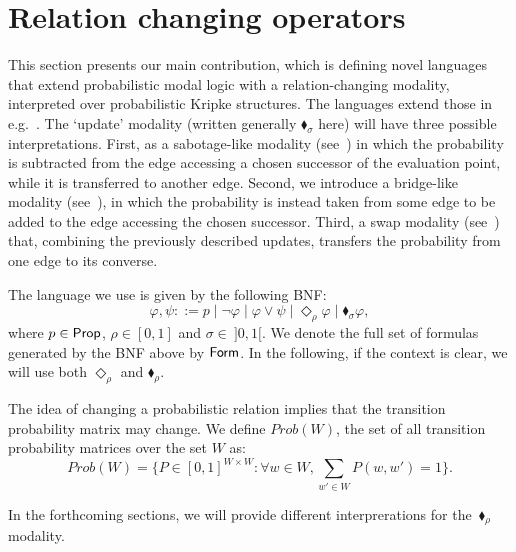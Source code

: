\section{Relation changing operators}\label{sec:prcml}

This section presents our main contribution, which is defining novel languages that extend probabilistic modal logic with a relation-changing modality, interpreted over probabilistic Kripke structures. The languages extend those in e.g.~\cite{ShiraziA07,ALDINI2024109167}. 
The `update' modality (written generally $\blacklozenge_{\sigma}$ here) will have three possible interpretations. First, as a sabotage-like modality (see~\cite{Fervari14,ArecesFH15,Aucher&vanBenthem&Grossi18})
in which the probability is subtracted from the edge accessing a chosen successor of the evaluation point, while it is transferred to another edge. Second, we introduce a bridge-like modality (see~\cite{Fervari14,ArecesFH15}), in which the probability is instead taken from some edge to be added to the edge accessing the chosen successor.  Third, a swap modality (see~\cite{ArecesFH14,Fervari14,ArecesFH15}) that, combining the previously described updates, transfers the probability from one edge to its converse. 
\begin{definition}[Language]
    \label{def:rc-language}
The language we use is given by the following BNF:
    \[
    \varphi, \psi ::= p \mid \neg \varphi \mid \varphi \vee \psi \mid \Diamond_\rho \varphi \mid \blacklozenge_{\sigma} \varphi,
    \]
where $p\in\mathsf{Prop}$, $\rho \in [0,1]$ and $\sigma \in \ ]0,1[$. We denote the full set of formulas generated by the BNF above by $\mathsf{Form}$. In the following, if the context is clear, we will use both $\Diamond_\rho$ and $\blacklozenge_\rho$.
\end{definition}

The idea of changing a probabilistic relation implies that the transition probability matrix may change.  We define $Prob(W)$, the set of all transition probability matrices over the set $W$ as:
\[ 
    Prob(W)=\{P\in [0,1]^{W\times W}:\forall w\in W,\displaystyle\sum_{w' \in W} P(w, w') = 1\}.
\]

In the forthcoming sections, we will provide different interprerations for the~$\blacklozenge_\rho$ modality.


